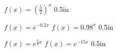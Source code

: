 








{
    $f(x) = \left(\frac{5}{2}\right)^x$
}
{0.5in}

\myProblems
{
    $f(x) = e^{-0.2x}$
}
{
    $f(x) = 0.98^x$
}
{0.5in}

\myProblems
    {
        $f(x) = e^{\frac{\pi}{2}x}$
    }
    {
        $f(x) = e^{-15x}$
    }
{0.5in}


       